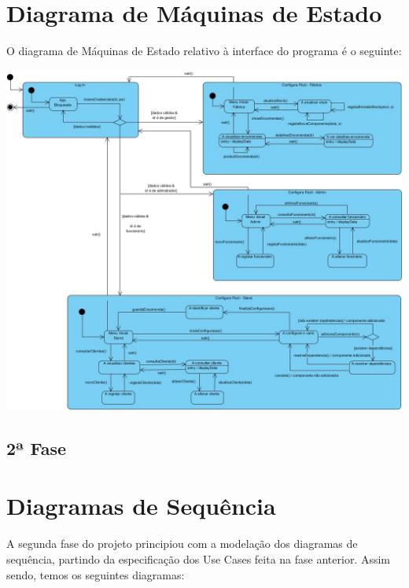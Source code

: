 \documentclass[11pt]{article} %
\begin{document}
\section{Diagrama de Máquinas de Estado}
O diagrama de Máquinas de Estado relativo à interface do programa é o seguinte:
	\begin{center}
		\includegraphics[width = 6in]{Maquina_de_Estado.jpg}
	\end{center}
	
\newpage

\begin{center}
\section*{2ª Fase}
\end{center}

\section{Diagramas de Sequência}
A segunda fase do projeto principiou com a modelação dos diagramas de sequência, partindo da especificação dos Use Cases feita na fase anterior. Assim sendo, temos os seguintes diagramas:
\end{document}
